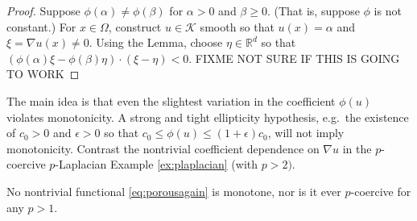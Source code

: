 \documentclass[letterpaper,final,12pt,reqno]{amsart}
\theoremstyle{cstyle}
\theoremstyle{cstyle*}
\theoremstyle{dstyle}
\numberwithin{equation}{section}
\numberwithin{figure}{section}
\numberwithin{table}{section}
\numberwithin{theorem}{section}
\newcommand{\eps}{\epsilon}
\newcommand{\RR}{\mathbb{R}}
\newcommand{\grad}{\nabla}
\newcommand{\cK}{\mathcal{K}}
\begin{document}
\begin{proof}
Suppose $\phi(\alpha)\ne \phi(\beta)$ for $\alpha > 0$ and $\beta \ge 0$.  (That is, suppose $\phi$ is not constant.)  For $x\in\Omega$, construct $u\in \cK$ smooth so that $u(x)=\alpha$ and $\xi = \grad u(x) \ne 0$.  Using the Lemma, choose $\eta \in \RR^d$ so that $(\phi(\alpha) \xi - \phi(\beta) \eta) \cdot (\xi - \eta) < 0$.  FIXME NOT SURE IF THIS IS GOING TO WORK
\end{proof}

The main idea is that even the slightest variation in the coefficient $\phi(u)$ violates monotonicity.  A strong and tight ellipticity hypothesis, e.g.~the existence of $c_0>0$ and $\eps>0$ so that $c_0 \le \phi(u) \le (1+\eps)c_0$, will not imply monotonicity.  Contrast the nontrivial coefficient dependence on $\grad u$ in the $p$-coercive $p$-Laplacian Example \ref{ex:plaplacian} (with $p>2)$.

No nontrivial functional \eqref{eq:porousagain} is monotone, nor is it ever $p$-coercive for any $p>1$.
\end{document}
